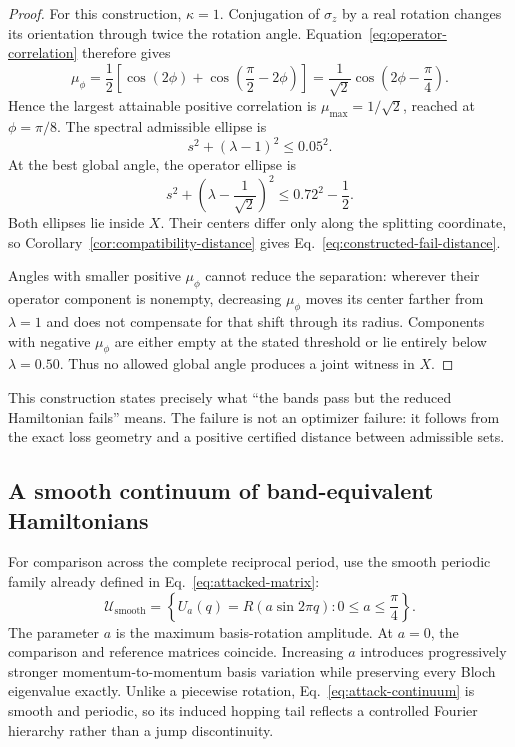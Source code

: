 \documentclass[11pt]{article}
\begin{document}
\begin{proof}
For this construction, $\kappa=1$. Conjugation of $\sigma_z$ by a real rotation changes
its orientation through twice the rotation angle. Equation~\eqref{eq:operator-correlation}
therefore gives
\[
 \mu_\phi
 =\frac12\left[\cos(2\phi)+\cos\left(\frac\pi2-2\phi\right)\right]
 =\frac{1}{\sqrt2}\cos\left(2\phi-\frac\pi4\right).
\]
Hence the largest attainable positive correlation is
$\mu_{\max}=1/\sqrt2$, reached at $\phi=\pi/8$. The spectral admissible ellipse is
\[
 s^2+(\lambda-1)^2\le0.05^2.
\]
At the best global angle, the operator ellipse is
\[
 s^2+\left(\lambda-\frac1{\sqrt2}\right)^2
 \le 0.72^2-\frac12.
\]
Both ellipses lie inside $X$. Their centers differ only along the splitting coordinate,
so Corollary~\ref{cor:compatibility-distance} gives
Eq.~\eqref{eq:constructed-fail-distance}.

Angles with smaller positive $\mu_\phi$ cannot reduce the separation: wherever their
operator component is nonempty, decreasing $\mu_\phi$ moves its center farther from
$\lambda=1$ and does not compensate for that shift through its radius. Components with
negative $\mu_\phi$ are either empty at the stated threshold or lie entirely below
$\lambda=0.50$. Thus no allowed global angle produces a joint witness in $X$.
\end{proof}

This construction states precisely what ``the bands pass but the reduced Hamiltonian
fails'' means. The failure is not an optimizer failure: it follows from the exact loss
geometry and a positive certified distance between admissible sets.

\subsection{A smooth continuum of band-equivalent Hamiltonians}

For comparison across the complete reciprocal period, use the smooth periodic family
already defined in Eq.~\eqref{eq:attacked-matrix}:
\begin{equation}
 \mathcal U_{\mathrm{smooth}}
 =\left\{U_a(q)=R\!\left(a\sin 2\pi q\right):
 0\le a\le\frac\pi4\right\}.
 \label{eq:attack-continuum}
\end{equation}
The parameter $a$ is the maximum basis-rotation amplitude. At $a=0$, the comparison and
reference matrices coincide. Increasing $a$ introduces progressively stronger
momentum-to-momentum basis variation while preserving every Bloch eigenvalue exactly.
Unlike a piecewise rotation, Eq.~\eqref{eq:attack-continuum} is smooth and periodic, so
its induced hopping tail reflects a controlled Fourier hierarchy rather than a jump
discontinuity.
\end{document}
